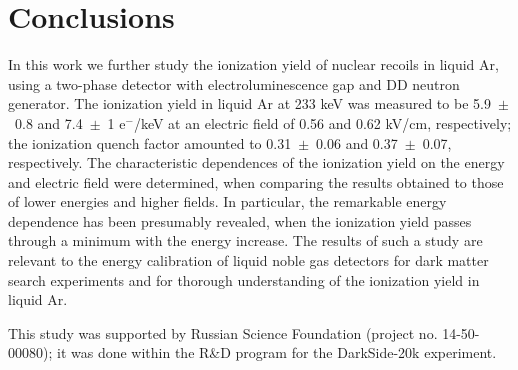 \documentclass[a4paper,11pt]{article}
\begin{document}
\section{Conclusions}

In this work we further study the ionization yield of nuclear recoils in liquid Ar, using a two-phase detector with electroluminescence gap and DD neutron generator. The ionization yield in
liquid Ar at 233 keV was measured to be 5.9~$\pm$~0.8
and 7.4~$\pm$~1 e$^-$/keV at an electric field of 0.56 and 0.62 kV/cm, respectively; the ionization quench factor amounted to 0.31~$\pm$~0.06 and 0.37~$\pm$~0.07, respectively. The characteristic dependences of the ionization yield on the energy and electric field were determined, when comparing the results obtained to those of lower energies and higher fields. In particular, the remarkable energy dependence has been presumably revealed, when the ionization yield passes through a minimum with the energy increase.
The results of such a study are relevant to the energy calibration of liquid
noble gas detectors for dark matter search experiments and for thorough
understanding of the ionization yield in liquid Ar.

\acknowledgments
This study was supported by Russian Science Foundation
(project no. 14-50-00080); it was done within the
R\&D program for the DarkSide-20k experiment.


\end{document}
